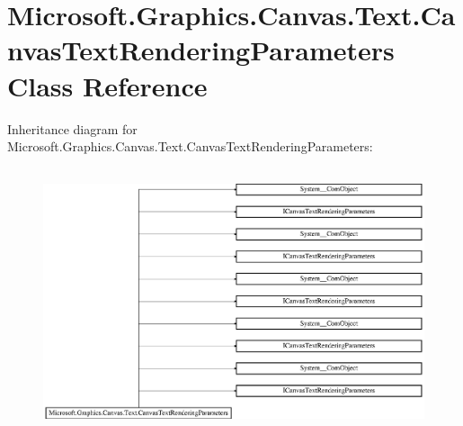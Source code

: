 \hypertarget{class_microsoft_1_1_graphics_1_1_canvas_1_1_text_1_1_canvas_text_rendering_parameters}{}\section{Microsoft.\+Graphics.\+Canvas.\+Text.\+Canvas\+Text\+Rendering\+Parameters Class Reference}
\label{class_microsoft_1_1_graphics_1_1_canvas_1_1_text_1_1_canvas_text_rendering_parameters}
Inheritance diagram for Microsoft.\+Graphics.\+Canvas.\+Text.\+Canvas\+Text\+Rendering\+Parameters\+:\begin{figure}[H]
\begin{center}
\leavevmode
\includegraphics[height=7.817258cm]{class_microsoft_1_1_graphics_1_1_canvas_1_1_text_1_1_canvas_text_rendering_parameters}
\end{center}
\end{figure}
